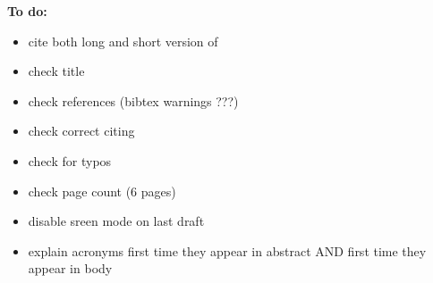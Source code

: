 \vspace{2em}
\textbf{\large To do:}
\vspace{1em}
\begin{itemize}[leftmargin=10pt]
	\item cite both long and short version of \cite{zen:statistical}
	\item check title
	\item check references (bibtex warnings ???)
	\item check correct citing
	\item check for typos
	\item check page count (6 pages)
	\item disable sreen mode on last draft
	\item explain acronyms first time they appear in abstract AND first time they appear in body
\end{itemize}

\iffalse
\vspace{2em}
\textbf{\large Open points:}
\vspace{1em}
\begin{itemize}[leftmargin=10pt]
	\item Improvements of deep learning in speech synthesis also about voice quality. Does that make sense in this context?
	\item Where the focus of this paper should be (deep learning / speech synthesis / embedded devices)? Most papers are available for:
	\begin{itemize}
		\item deep learning <---> speech synthesis
		\item deep learning <---> embedded devices
	\end{itemize}
	\item Where to go into technical detail? Suggestion: One way of improving speech synthesis with deep learning.
	\item Core paper on \ac{SPSS} \cite{zen:statistical} available in two versions (4 and 23 pages). Which one to use as core paper? Suggestion: 4 page version as core paper and 23 page version as reference.
	\item Connection between the improvements of deep learning on speech synthesis (Section~\ref{subsec:deepspeech}) and the implementation of speech synthesis with/without deep learning (Section~\ref{sec:embeddedspeech})?
	\item Strictly spoken a smartphone/tablet is not an "embedded" device. Is some form of further declaration necessary in this context?
\end{itemize}
\fi

